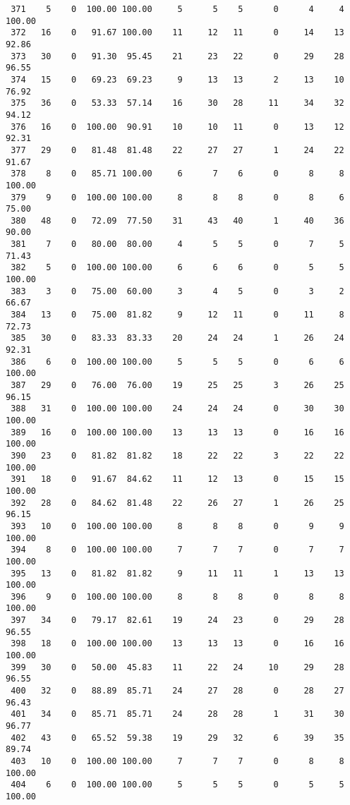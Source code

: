 \begin{verbatim}
 371    5    0  100.00 100.00     5      5    5      0      4     4   100.00
 372   16    0   91.67 100.00    11     12   11      0     14    13    92.86
 373   30    0   91.30  95.45    21     23   22      0     29    28    96.55
 374   15    0   69.23  69.23     9     13   13      2     13    10    76.92
 375   36    0   53.33  57.14    16     30   28     11     34    32    94.12
 376   16    0  100.00  90.91    10     10   11      0     13    12    92.31
 377   29    0   81.48  81.48    22     27   27      1     24    22    91.67
 378    8    0   85.71 100.00     6      7    6      0      8     8   100.00
 379    9    0  100.00 100.00     8      8    8      0      8     6    75.00
 380   48    0   72.09  77.50    31     43   40      1     40    36    90.00
 381    7    0   80.00  80.00     4      5    5      0      7     5    71.43
 382    5    0  100.00 100.00     6      6    6      0      5     5   100.00
 383    3    0   75.00  60.00     3      4    5      0      3     2    66.67
 384   13    0   75.00  81.82     9     12   11      0     11     8    72.73
 385   30    0   83.33  83.33    20     24   24      1     26    24    92.31
 386    6    0  100.00 100.00     5      5    5      0      6     6   100.00
 387   29    0   76.00  76.00    19     25   25      3     26    25    96.15
 388   31    0  100.00 100.00    24     24   24      0     30    30   100.00
 389   16    0  100.00 100.00    13     13   13      0     16    16   100.00
 390   23    0   81.82  81.82    18     22   22      3     22    22   100.00
 391   18    0   91.67  84.62    11     12   13      0     15    15   100.00
 392   28    0   84.62  81.48    22     26   27      1     26    25    96.15
 393   10    0  100.00 100.00     8      8    8      0      9     9   100.00
 394    8    0  100.00 100.00     7      7    7      0      7     7   100.00
 395   13    0   81.82  81.82     9     11   11      1     13    13   100.00
 396    9    0  100.00 100.00     8      8    8      0      8     8   100.00
 397   34    0   79.17  82.61    19     24   23      0     29    28    96.55
 398   18    0  100.00 100.00    13     13   13      0     16    16   100.00
 399   30    0   50.00  45.83    11     22   24     10     29    28    96.55
 400   32    0   88.89  85.71    24     27   28      0     28    27    96.43
 401   34    0   85.71  85.71    24     28   28      1     31    30    96.77
 402   43    0   65.52  59.38    19     29   32      6     39    35    89.74
 403   10    0  100.00 100.00     7      7    7      0      8     8   100.00
 404    6    0  100.00 100.00     5      5    5      0      5     5   100.00

\end{verbatim}
